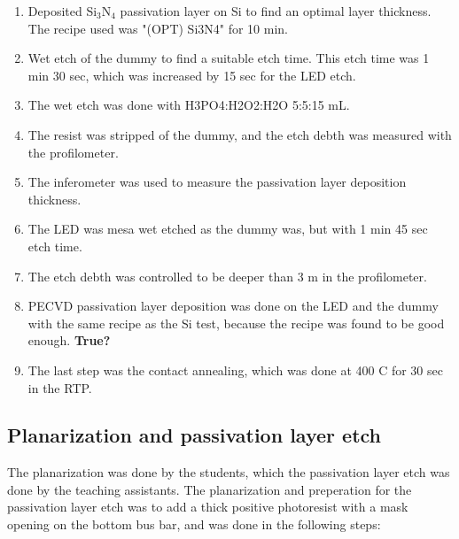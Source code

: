 \begin{enumerate}
    \item Deposited Si$_3$N$_4$ passivation layer on Si to find an optimal layer thickness. The recipe used was "(OPT) Si3N4" for 10 min.
    \item Wet etch of the dummy to find a suitable etch time. This etch time was 1 min 30 sec, which was increased by 15 sec for the LED etch.
    \item The wet etch was done with H3PO4:H2O2:H2O 5:5:15 mL.
    \item The resist was stripped of the dummy, and the etch debth was measured with the profilometer.
    \item The inferometer was used to measure the passivation layer deposition thickness.
    \item The LED was mesa wet etched as the dummy was, but with 1 min 45 sec etch time.
    \item The etch debth was controlled to be deeper than 3 \textmu m in the profilometer.
    \item PECVD passivation layer deposition was done on the LED and the dummy with the same recipe as the Si test, because the recipe was found to be good enough. \textbf{True?}
    \item The last step was the contact annealing, which was done at 400 \textdegree C for 30 sec in the RTP.
\end{enumerate}






\subsection{Planarization and passivation layer etch}
\label{methods:Planarization}

The planarization was done by the students, which the passivation layer etch was done by the teaching assistants.
The planarization and preperation for the passivation layer etch was to add a thick positive photoresist with a mask opening on the bottom bus bar, and was done in the following steps:

